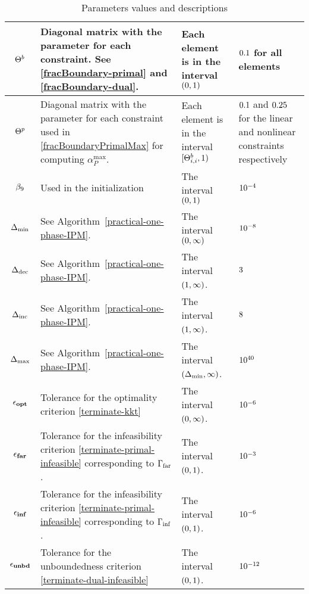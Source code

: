 \documentclass{article}
\begin{document}
\begin{table}[H]
\begin{tabular}{ |c| p{7cm}|p{4.0cm}| p{3cm}| }
\hline
 $\Theta^{b}$ & Diagonal matrix with the \fracBound{} parameter for each constraint. See \eqref{fracBoundary-primal} and \eqref{fracBoundary-dual}. & Each element is in the interval $(0,1)$ & $0.1$ for all elements \\ 
        \hline
$\Theta^{p}$ & Diagonal matrix with the \fracBound{} parameter for each constraint used in \eqref{fracBoundaryPrimalMax} for computing $\alpha_{P}^{\max}$. & Each element is in the interval $[\Theta^{b}_{i,i}, 1)$ & $0.1$ and $0.25$ for the linear and nonlinear constraints respectively \\
\hline
$\beta_{9}$  & Used in the initialization & The interval $(0,1)$ & $10^{-4}$ \\
\hline
$\Delta_{\min}$ & See Algorithm~\ref{practical-one-phase-IPM}.  & The interval $(0,\infty)$ & $10^{-8}$ \\
\hline
$\Delta_{\text{dec}}$ & See Algorithm~\ref{practical-one-phase-IPM}. &The interval $(1,\infty)$. & $3$ \\
\hline
$\Delta_{\text{inc}}$ & See Algorithm~\ref{practical-one-phase-IPM}. &The interval $(1,\infty)$. & $8$ \\
\hline
$\Delta_{\max}$ & See Algorithm~\ref{practical-one-phase-IPM}. &The interval $(\Delta_{\min},\infty)$. & $10^{40}$ \\
\hline
$\epsilon_{\textbf{opt}}$ & Tolerance for the optimality criterion \eqref{terminate-kkt} & The interval $(0,\infty)$. & $10^{-6}$  \\
\hline
$\epsilon_{\textbf{far}}$ & Tolerance for the infeasibility criterion \eqref{terminate-primal-infeasible} corresponding to $\Gamma_{\text{far}}$. & The interval $(0,1)$. & $10^{-3}$ \\
\hline
$\epsilon_{\textbf{inf}}$ & Tolerance for the infeasibility criterion \eqref{terminate-primal-infeasible} corresponding to $\Gamma_{\text{inf}}$. & The interval $(0,1)$. & $10^{-6}$ \\
\hline
$\epsilon_{\textbf{unbd}}$ & Tolerance for the unboundedness criterion \eqref{terminate-dual-infeasible} & The interval $(0,1)$. & $10^{-12}$ \\
\hline
\end{tabular}
\caption{Parameters values and descriptions}
\end{table}
\end{document}
